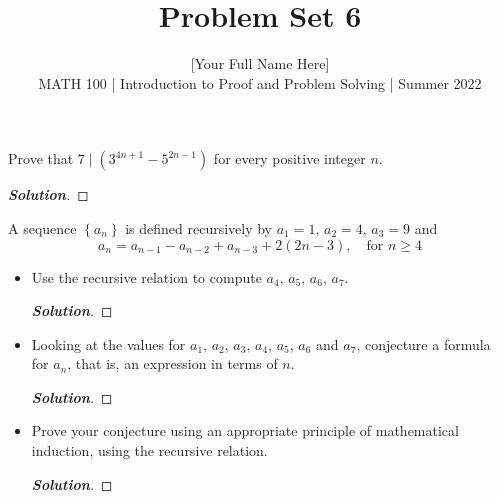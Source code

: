 \documentclass[11pt]{article}
\newenvironment{problem}[2][Problem\!]{\begin{trivlist}
\item[\hskip \labelsep {\bfseries #1}\hskip \labelsep {\bfseries #2.}]}{\end{trivlist}}
\newenvironment{solution}{\begin{proof}[\textbf{\textit{Solution}}]}{\end{proof}}
\newcommand{\set}[1]{\left\{#1\right\}} %
\renewcommand{\geq}{\geqslant}
\begin{document}
 
\title{Problem Set 6}
\author{[Your Full Name Here]\\[0.5em]
MATH 100 | Introduction to Proof and Problem Solving | Summer 2022}
\date{} 
\maketitle


\begin{problem}{6.1}
Prove that $7 \mid (3^{4n+1} - 5^{2n-1})$ for every positive integer $n$.
\end{problem}
\begin{solution}\hfill %
\end{solution}

\newpage %

\begin{problem}{6.2}
A sequence $\set{a_n}$ is defined recursively by $a_1 = 1,\, a_2 = 4,\, a_3 = 9$ and
\[a_n = a_{n-1} - a_{n-2} + a_{n-3} + 2(2n - 3),\quad \text{for $n \geq 4$}\]
\begin{itemize}[itemsep=3em]
\item[(a)] Use the recursive relation to compute $a_4,\,a_5,\,a_6,\,a_7$.
\begin{solution}\hfill %
\end{solution}

\item[(b)] Looking at the values for $a_1,\,a_2,\,a_3,\,a_4,\,a_5,\,a_6$ and $a_7$, conjecture a formula for $a_n$, that is, an expression in terms of $n$.
\begin{solution}\hfill %
\end{solution}

\item[(c)] Prove your conjecture using an appropriate principle of mathematical induction, using the recursive relation.
\begin{solution}\hfill %
\end{solution}

\end{itemize}
\end{problem}
\end{document}
